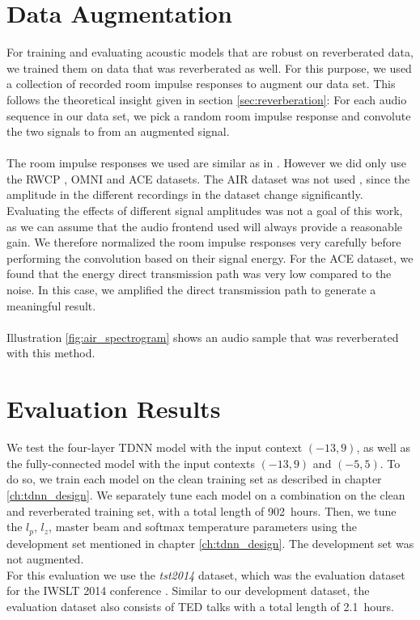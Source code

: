 \section{Data Augmentation}
For training and evaluating acoustic models that are robust on reverberated data, we trained them on data that was reverberated as well. For this purpose, we used a collection of recorded room impulse responses to augment our data set. This follows the theoretical insight given in section \ref{sec:reverberation}: For each audio sequence in our data set, we pick a random room impulse response and convolute the two signals to from an augmented signal. \\ \\
The room impulse responses we used are similar as in \cite{ritter2016training}. However we did only use the RWCP \cite{nakamura2000acoustical}, OMNI \cite{stewart2010database} and ACE \cite{eaton2015ace} datasets. The AIR dataset was not used \cite{jeub2009binaural}, since the amplitude in the different recordings in the dataset change significantly.
Evaluating the effects of different signal amplitudes was not a goal of this work, as we can assume that the audio frontend used will always provide a reasonable gain. We therefore normalized the room impulse responses very carefully before performing the convolution based on their signal energy. For the ACE dataset, we found that the energy direct transmission path was very low compared to the noise. In this case, we amplified the direct transmission path to generate a meaningful result. \\ \\
Illustration \ref{fig:air_spectrogram} shows an audio sample that was reverberated with this method. 
\section{Evaluation Results}
We test the four-layer TDNN model with the input context $(-13, 9)$, as well as the fully-connected model with the input contexts $(-13, 9)$ and $(-5, 5)$. To do so, we train each model on the clean training set as described in chapter \ref{ch:tdnn_design}. We separately tune each model on a combination on the clean and reverberated training set, with a total length of 902~hours. Then, we tune the $l_p$, $l_z$, master beam and softmax temperature parameters using the development set mentioned in chapter \ref{ch:tdnn_design}. The development set was not augmented. \\ 
For this evaluation we use the \textit{tst2014} dataset, which was the evaluation dataset for the IWSLT 2014 conference \cite{cettolo2014report}. Similar to our development dataset, the evaluation dataset also consists of TED talks with a total length of 2.1~hours. 

